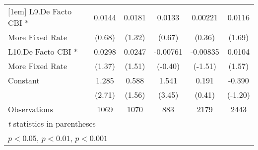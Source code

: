 {\begin{tabular}{l*{5}{c}}
[1em]
L9.De Facto CBI *   &      0.0144         &      0.0181         &      0.0133         &     0.00221         &      0.0116         \\
More Fixed Rate     &      (0.68)         &      (1.32)         &      (0.67)         &      (0.36)         &      (1.69)         \\
[1em]
L10.De Facto CBI *  &      0.0298         &      0.0247         &    -0.00761         &    -0.00835         &      0.0104         \\
More Fixed Rate     &      (1.37)         &      (1.51)         &     (-0.40)         &     (-1.51)         &      (1.57)         \\
[1em]
Constant            &       1.285\sym{**} &       0.588         &       1.541\sym{***}&       0.191         &      -0.390         \\
                    &      (2.71)         &      (1.56)         &      (3.45)         &      (0.41)         &     (-1.20)         \\
\hline
Observations        &        1069         &        1070         &         883         &        2179         &        2443         \\
\hline\hline
\multicolumn{6}{l}{\footnotesize \textit{t} statistics in parentheses}\\
\multicolumn{6}{l}{\footnotesize \sym{*} \(p<0.05\), \sym{**} \(p<0.01\), \sym{***} \(p<0.001\)}\\
\end{tabular}
}
